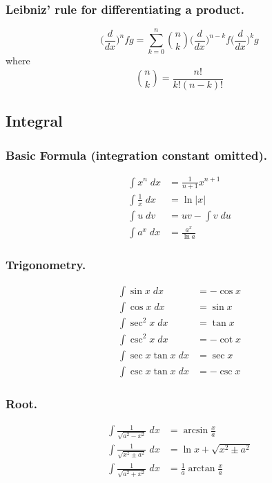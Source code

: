 \documentclass[../main.tex]{subfiles}
\begin{document}
\subsubsection*{Leibniz’ rule for differentiating a product.}
\begin{equation*}
    \biggl(\frac{d}{dx}\biggr)^{n}fg=\sum_{k=0}^n {n \choose k}\biggl(\frac{d}{dx}\biggr)^{n-k} f \biggl(\frac{d}{dx}\biggr)^{k}g
\end{equation*}
where
\begin{equation*}
    {n \choose k}={\frac{n!}{k! (n-k)!}}
\end{equation*}

\subsection*{Integral}
\subsubsection*{Basic Formula (integration constant omitted).}
\begin{align*}
    \int x^n \;dx &= \frac{1}{n+1}x^{n+1}\\
    \int \frac{1}{x}\;dx& = \ln |x|\\
    \int u \;dv& = uv - \int v\; du\\
    \int a^x \;dx&=\frac{a^x}{\ln a}
\end{align*}

\subsubsection*{Trigonometry.}
\begin{align*}
    \int \sin x \; dx&=-\cos x\\
    \int \cos x \; dx&=\sin x\\
    \int \sec^2 x \; dx&=\tan x\\
    \int \csc^2 x \; dx&=-\cot x\\
    \int \sec x\tan x \; dx&=\sec x\\
    \int \csc x\tan x \; dx&=-\csc x
\end{align*}

\subsubsection*{Root.}
\begin{align*}
    \int \frac{1}{\sqrt{a^2-x^2}}\;dx&=\arcsin \frac{x}{a}\\
    \int \frac{1}{\sqrt{x^2\pm a^2}}\;dx&=\ln x +\sqrt{x^2\pm a^2}\\
    \int \frac{1}{\sqrt{a^2+x^2}}\;dx&=\frac{1}{a}\arctan \frac{x}{a}
\end{align*}
\end{document}
